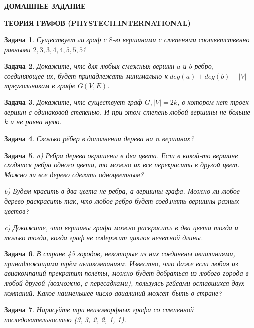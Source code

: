 \documentclass[12pt,a4paper,fleqn]{article}
\newtheorem{exersize}{Задача}
\begin{document}
\begin{center}
	\bf \Large ДОМАШНЕЕ ЗАДАНИЕ
	
	\bf \Large ТЕОРИЯ ГРАФОВ (PHYSTECH.INTERNATIONAL)
\end{center}

\begin{exersize}
	Существует ли граф с $8$-ю вершинами с степенями соответственно равными $2, 3, 3, 4, 4, 5, 5, 5$?
\end{exersize}

\begin{exersize}
	Докажите, что для любых смежных вершин $a$ и $b$ ребро, соединяющее их, будет принадлежать минимально к $deg (a) + deg (b) - |V|$ треугольникам в графе $G(V, E)$.
\end{exersize}

\begin{exersize}
	Докажите, что существует граф $G, |V| = 2k$, в котором нет троек вершин с одинаковой степенью. И при этом степень любой вершины не больше $k$ и не равна нулю.
\end{exersize}

\begin{exersize}
	Сколько рёбер в дополнении дерева на $n$ вершинах?	
\end{exersize}	

\begin{exersize}
	a) Ребра дерева окрашены в два цвета. Если в какой-то вершине сходятся ребра одного цвета, то можно их все перекрасить в другой цвет. Можно ли все дерево сделать одноцветным?
	
	b) Будем красить в два цвета не ребра, а вершины графа. Можно ли любое дерево раскрасить так, что любое ребро будет соединять вершины разных цветов?
	
	c) Докажите, что вершины графа можно раскрасить в два цвета тогда и только тогда, когда граф не содержит циклов нечетной длины.
\end{exersize}	

\begin{exersize}
	В стране 45 городов, некоторые из них соединены авиалиниями, принадлежащими трём авиакомпаниям. Известно, что даже если любая из авиакомпаний прекратит полёты, можно будет добраться из любого города в любой другой (возможно, с пересадками), пользуясь рейсами оставшихся двух компаний. Какое наименьшее число авиалиний может быть в стране?
\end{exersize}	

\begin{exersize}
	Нарисуйте три неизоморфных графа со степенной последовательностью (3, 3, 2, 2, 1, 1).
\end{exersize}
\end{document}
